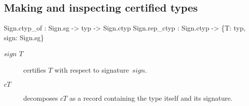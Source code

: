 \subsection{Making and inspecting certified types}
\begin{ttbox} 
Sign.ctyp_of  : Sign.sg -> typ -> Sign.ctyp
Sign.rep_ctyp : Sign.ctyp -> \{T: typ, sign: Sign.sg\}
\end{ttbox}
\begin{description}
\item[ $sign$ $T$] 
certifies $T$ with respect to signature~$sign$.

\item[ $cT$] 
decomposes $cT$ as a record containing the type itself and its signature.
\end{description}

